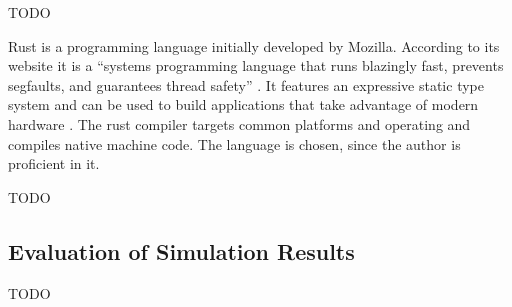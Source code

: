 TODO


Rust is a programming language initially developed by Mozilla.
According to its website it is a \enquote{systems programming language that runs blazingly fast, prevents segfaults, and guarantees thread safety} \autocite{rust2018rust}.
It features an expressive static type system and can be used to build applications that take advantage of modern hardware
\autocite[][]{matsakis2014rust}.
The rust compiler targets common platforms and operating and compiles native machine code.
The language is chosen, since the author is proficient in it.


TODO
\subsection{Evaluation of Simulation Results}
TODO

